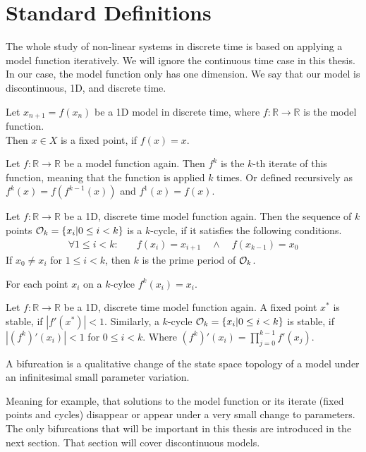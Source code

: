 \section{Standard Definitions}

The whole study of non-linear systems in discrete time is based on applying a model function iteratively.
We will ignore the continuous time case in this thesis.
In our case, the model function only has one dimension.
We say that our model is discontinuous, 1D, and discrete time.

\begin{definition}
	Let $x_{n+1} = f(x_n)$ be a 1D model in discrete time, where $f: \mathbb{R} \to \mathbb{R}$ is the model function. \\
	Then $x \in X$ is a fixed point, if $f(x) = x$.
\end{definition}

\begin{definition}
	Let $f: \mathbb{R} \to \mathbb{R}$ be a model function again.
	Then $f^k$ is the $k$-th iterate of this function, meaning that the function is applied $k$ times.
	Or defined recursively as $f^k(x) = f(f^{k-1}(x))$ and $f^1(x) = f(x)$.
\end{definition}

\begin{definition}[Cycle]
	Let $f: \mathbb{R} \to \mathbb{R}$ be a 1D, discrete time model function again.
	Then the sequence of $k$ points $\mathcal{O}_k = \{x_i | 0 \leq i < k\}$ is a $k$-cycle, if it satisfies the following conditions.
	\begin{align*}
		\forall 1 \leq i < k: \quad & f(x_i) = x_{i+1} \quad \land \quad f(x_{k-1}) = x_0
	\end{align*}
	If $x_0 \neq x_i$ for $1 \leq i < k$, then $k$ is the prime period of $\mathcal{O}_k$.
\end{definition}

For each point $x_i$ on a $k$-cylce $f^k(x_i) = x_i$.

\begin{definition}[Stability]
	Let $f: \mathbb{R} \to \mathbb{R}$ be a 1D, discrete time model function again.
	A fixed point $x^*$ is stable, if $|f'(x^*)| < 1$.
	Similarly, a $k$-cycle $\mathcal{O}_k = \{x_i | 0 \leq i < k\}$ is stable, if $|(f^k)'(x_i)| < 1$ for $0 \leq i < k$.
	Where $(f^k)'(x_i) = \prod_{j=0}^{k-1} f'(x_j)$.
\end{definition}

\begin{definition}[Bifurcation]
	A bifurcation is a qualitative change of the state space topology of a model under an infinitesimal small parameter variation.
\end{definition}
Meaning for example, that solutions to the model function or its iterate (fixed points and cycles) disappear or appear under a very small change to parameters.
The only bifurcations that will be important in this thesis are introduced in the next section.
That section will cover discontinuous models.
